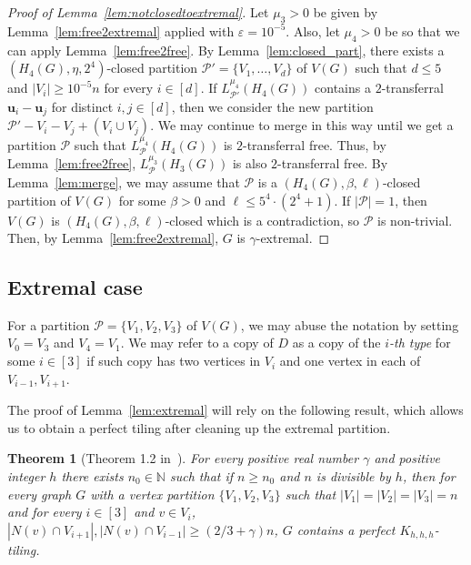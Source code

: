 \documentclass[11pt]{amsart}
\newtheorem{theorem}{Theorem}[section]
\def\N{\mathbb{N}}
\newcommand{\CP}{\mathcal{P}}
\newcommand{\veps}{\varepsilon}
\begin{document}
\begin{proof}[Proof of Lemma~\ref{lem:notclosedtoextremal}]
    Let $\mu_3 >0$ be given by Lemma~\ref{lem:free2extremal} applied with $\veps = 10^{-5}$. Also, let $\mu_4>0$ be so that we can apply Lemma~\ref{lem:free2free}. 
    By Lemma~\ref{lem:closed_part}, there exists a $(H_4(G),\eta,2^{4})$-closed partition $\CP'=\{V_1,\dots,V_d\}$ of $V(G)$ such that $d\le 5$ and $|V_i|\geq 10^{-5} n$ for every $i\in [d]$.
    If $L_{\CP'}^{\mu_4}(H_4(G))$ contains a $2$-transferral $\textbf{u}_i-\textbf{u}_j$ for distinct $i,j\in [d]$,
    then we consider the new partition $\CP'-V_i-V_j+(V_i\cup V_j)$.
    We may continue to merge in this way until we get a partition $\CP$ such that $L_{\CP}^{\mu_4}(H_4(G))$ is $2$-transferral free. Thus, by Lemma~\ref{lem:free2free}, $L_{\CP}^{\mu_3}(H_3(G))$ is also $2$-transferral free.
    By Lemma~\ref{lem:merge}, we may assume that $\CP$ is a $(H_4(G),\beta,\ell)$-closed partition of $V(G)$ for some $\beta>0$ and $\ell\le 5^{4}\cdot (2^{4}+1)$.   
    If $|\CP|=1$, then $V(G)$ is $(H_4(G),\beta,\ell)$-closed which is a contradiction, so $\CP$ is non-trivial.
    Then, by Lemma~\ref{lem:free2extremal}, $G$ is $\gamma$-extremal.
\end{proof}

\subsection{Extremal case}\label{subsec:ext}

For a partition $\CP =\{ V_1,V_2,V_3 \}$ of $V(G)$, we may abuse the notation by setting $V_0=V_3$ and $V_4=V_1$. We may refer to a copy of $D$ as a copy of the \emph{$i$-th type} for some $i\in[3]$ if such copy has two vertices in $V_i$ and one vertex in each of $V_{i-1},V_{i+1}$. 

The proof of Lemma~\ref{lem:extremal} will rely on the following result, which allows us to obtain a perfect tiling after cleaning up the extremal partition. 

\begin{theorem}[Theorem 1.2 in~\cite{martin-zhao}]\label{thm:blackbox}
    For every positive real number $\gamma$ and positive integer $h$ there exists $n_0 \in \N$ such that if $n\ge n_0$ and $n$ is divisible by $h$, then for every graph $G$ with a vertex partition $\{V_1,V_2,V_3\}$ such that $|V_1|=|V_2|=|V_3|=n$ and for every $i\in [3]$ and $v\in V_i$, $|N(v)\cap V_{i+1}|,|N(v)\cap V_{i-1}|\ge (2/3+\gamma) n$, $G$ contains a perfect $K_{h,h,h}$-tiling.
\end{theorem}
\end{document}
